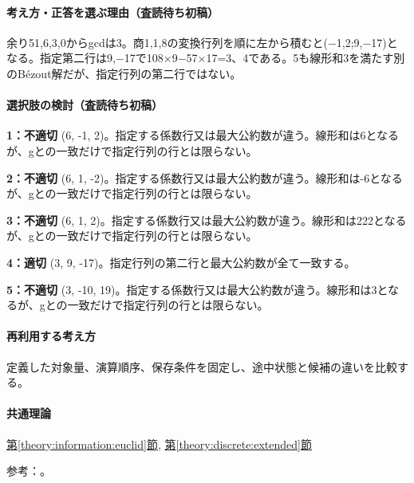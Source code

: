 \paragraph{考え方・正答を選ぶ理由（査読待ち初稿）} 余り51,6,3,0からgcdは3。商1,1,8の変換行列を順に左から積むと(−1,2;9,−17)となる。指定第二行は9,−17で108×9−57×17=\allowbreak{}3、4である。5も線形和3を満たす別のBézout解だが、指定行列の第二行ではない。

\paragraph{選択肢の検討（査読待ち初稿）}\mbox{}\par

\noindent\textbf{1：不適切} (6, -1, 2)。指定する係数行又は最大公約数が違う。線形和は6となるが、gとの一致だけで指定行列の行とは限らない。\par

\noindent\textbf{2：不適切} (6, 1, -2)。指定する係数行又は最大公約数が違う。線形和は-6となるが、gとの一致だけで指定行列の行とは限らない。\par

\noindent\textbf{3：不適切} (6, 1, 2)。指定する係数行又は最大公約数が違う。線形和は222となるが、gとの一致だけで指定行列の行とは限らない。\par

\noindent\textbf{4：適切} (3, 9, -17)。指定行列の第二行と最大公約数が全て一致する。\par

\noindent\textbf{5：不適切} (3, -10, 19)。指定する係数行又は最大公約数が違う。線形和は3となるが、gとの一致だけで指定行列の行とは限らない。\par

\paragraph{再利用する考え方} 定義した対象量、演算順序、保存条件を固定し、途中状態と候補の違いを比較する。

\paragraph{共通理論} \hyperref[theory:information:euclid]{第\ref*{theory:information:euclid}節}, \hyperref[theory:discrete:extended]{第\ref*{theory:discrete:extended}節}

\par 参考：\cite{mit_discrete2015}。

